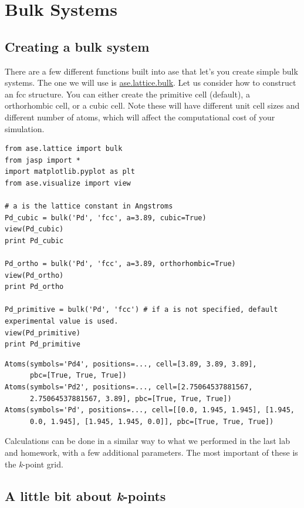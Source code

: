 \documentclass[11pt]{article}
\begin{document}
\section{Bulk Systems}
\label{sec-2}

\subsection{Creating a bulk system}
\label{sec-2-1}

There are a few different functions built into ase that let's you create simple bulk systems. The one we will use is \href{ase.lattice.bulk}{ase.lattice.bulk}. Let us consider how to construct an fcc structure. You can either create the primitive cell (default), a orthorhombic cell, or a cubic cell. Note these will have different unit cell sizes and different number of atoms, which will affect the computational cost of your simulation. 

\begin{verbatim}
from ase.lattice import bulk
from jasp import *
import matplotlib.pyplot as plt
from ase.visualize import view

# a is the lattice constant in Angstroms
Pd_cubic = bulk('Pd', 'fcc', a=3.89, cubic=True) 
view(Pd_cubic)
print Pd_cubic

Pd_ortho = bulk('Pd', 'fcc', a=3.89, orthorhombic=True)
view(Pd_ortho)
print Pd_ortho

Pd_primitive = bulk('Pd', 'fcc') # if a is not specified, default experimental value is used.
view(Pd_primitive)
print Pd_primitive
\end{verbatim}

\begin{verbatim}
Atoms(symbols='Pd4', positions=..., cell=[3.89, 3.89, 3.89],
      pbc=[True, True, True])
Atoms(symbols='Pd2', positions=..., cell=[2.75064537881567,
      2.75064537881567, 3.89], pbc=[True, True, True])
Atoms(symbols='Pd', positions=..., cell=[[0.0, 1.945, 1.945], [1.945,
      0.0, 1.945], [1.945, 1.945, 0.0]], pbc=[True, True, True])
\end{verbatim}

Calculations can be done in a similar way to what we performed in the last lab and homework, with a few additional parameters. The most important of these is the \emph{k}-point grid.

\subsection{A little bit about \emph{k}-points}
\label{sec-2-2}
\end{document}
